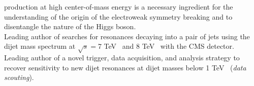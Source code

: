 \documentclass[10pt, a4paper]{article}
\newcommand{\years}[1]{\marginnote{\hskip-0.2in{\small #1}}}
\begin{document}
production at high center-of-mass energy is a necessary ingredient for the understanding of the origin of the electroweak symmetry breaking and to disentangle the nature of the Higgs boson. \\ [1em] 
\years{Sep 2011 - today}Leading author of searches for resonances 
decaying into a pair of jets using the dijet mass spectrum 
at $\sqrt{s}=$7 TeV~\cite{CMS:2012yf,AN-12-012} and 8 TeV~\cite{Chatrchyan:2013qha,AN-12-229,CMS-PAS-EXO-12-059,AN-12-455} with the CMS detector. 
Leading author of a novel trigger, data acquisition, and analysis strategy to recover sensitivity to new dijet resonances at dijet masses below 1 TeV~\cite{CMS-PAS-EXO-11-094} ({\it data scouting}). \\ [1em] 
\end{document}
